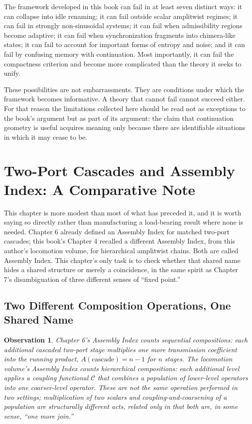 \documentclass[12pt]{article}
\newtheorem{observation}{Observation}
\begin{document}
The framework developed in this book can fail in at least seven distinct ways: it can collapse into idle renaming; it can fail outside scalar amplitwist regimes; it can fail in strongly non-sinusoidal systems; it can fail when admissibility regions become adaptive; it can fail when synchronization fragments into chimera-like states; it can fail to account for important forms of entropy and noise; and it can fail by confusing memory with continuation. Most importantly, it can fail the compactness criterion and become more complicated than the theory it seeks to unify.

These possibilities are not embarrassments. They are conditions under which the framework becomes informative. A theory that cannot fail cannot succeed either. For that reason the limitations collected here should be read not as exceptions to the book's argument but as part of its argument: the claim that continuation geometry is useful acquires meaning only because there are identifiable situations in which it may cease to be.

\section{Two-Port Cascades and Assembly Index: A Comparative Note}

This chapter is more modest than most of what has preceded it, and it is worth saying so directly rather than manufacturing a load-bearing result where none is needed. Chapter 6 already defined an Assembly Index for matched two-port cascades; this book's Chapter 4 recalled a different Assembly Index, from this author's locomotion volume, for hierarchical amplitwist chains. Both are called Assembly Index. This chapter's only task is to check whether that shared name hides a shared structure or merely a coincidence, in the same spirit as Chapter 7's disambiguation of three different senses of ``fixed point.''

\subsection{Two Different Composition Operations, One Shared Name}

\begin{observation}
Chapter 6's Assembly Index counts sequential compositions: each additional cascaded two-port stage multiplies one more transmission coefficient into the running product, $A(\text{cascade}) = n-1$ for $n$ stages. The locomotion volume's Assembly Index counts hierarchical compositions: each additional level applies a coupling functional $\mathcal{C}$ that combines a population of lower-level operators into one coarser-level operator. These are not the same operation performed in two settings; multiplication of two scalars and coupling-and-coarsening of a population are structurally different acts, related only in that both are, in some sense, ``one more join.''
\end{observation}
\end{document}
